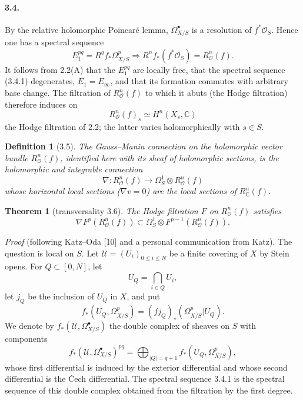 \documentclass[10pt]{article}
\newcommand{\C}{\mathbb C}
\newcommand{\cO}{\mathcal O}
\newcommand{\cU}{\mathcal U}
\theoremstyle{deligne}
\newtheorem*{definition}{Definition}
\newtheorem*{theorem}{Theorem}
\begin{document}
\paragraph{3.4.}
By the relative holomorphic Poincaré lemma, $\Omega_{X/S}^\bullet$ is a resolution of $f^*\cO_S$. Hence one has a spectral sequence
\begin{equation}
E_1^{pq}=R^qf_*\Omega^p_{X/S}\Rightarrow R^n f_*(f^*\cO_S)=R_\cO^n(f).
\tag{3.4.1}
\end{equation}
It follows from 2.2(A) that the $E_1^{pq}$ are locally free, that the spectral sequence (3.4.1) degenerates, $E_1=E_\infty$, and that its formation commutes with arbitrary base change. The filtration of $R_\cO^n(f)$ to which it abuts (the Hodge filtration) therefore induces on
\[
R_\cO^n(f)_s\simeq H^n(X_s,\C)
\]
the Hodge filtration of 2.2; the latter varies holomorphically with $s\in S$.

\begin{definition}[3.5]
The Gauss--Manin connection on the holomorphic vector bundle $R_\cO^n(f)$, identified here with its sheaf of holomorphic sections, is the holomorphic and integrable connection
\[
\nabla:R_\cO^n(f)\longrightarrow\Omega_S^1\otimes R_\cO^n(f)
\]
whose horizontal local sections ($\nabla v=0$) are the local sections of $R_\C^n(f)$.
\end{definition}

\begin{theorem}[transversality 3.6]
The Hodge filtration $F$ on $R_\cO^n(f)$ satisfies
\[
\nabla F^p(R_\cO^n(f))\subset \Omega_S^1\otimes F^{p-1}(R_\cO^n(f)).
\]
\end{theorem}

\emph{Proof} (following Katz--Oda [10] and a personal communication from Katz). The question is local on $S$. Let $\cU=(U_i)_{0\le i\le N}$ be a finite covering of $X$ by Stein opens. For $Q\subset[0,N]$, let
\[
U_Q=\bigcap_{i\in Q}U_i,
\]
let $j_Q$ be the inclusion of $U_Q$ in $X$, and put
\[
f_*(U_Q,\Omega^p_{X/S})=(fj_Q)_*(\Omega^p_{X/S}|U_Q).
\]
We denote by $f_*(\cU,\Omega^\bullet_{X/S})$ the double complex of sheaves on $S$ with components
\begin{equation}
f_*(\cU,\Omega^\bullet_{X/S})^{pq}=\bigoplus_{|Q|=q+1} f_*(U_Q,\Omega^p_{X/S}),
\tag{3.6.1}
\end{equation}
whose first differential is induced by the exterior differential and whose second differential is the Čech differential. The spectral sequence 3.4.1 is the spectral sequence of this double complex obtained from the filtration by the first degree.
\end{document}
